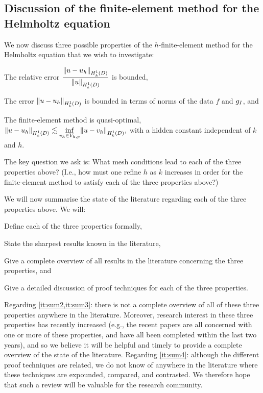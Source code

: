 \subsection{Discussion of the finite-element method for the Helmholtz equation}\label{sec:helmfedisc}

We now discuss three possible properties of the $h$-finite-element method for the Helmholtz equation that we wish to investigate:
\bit
\item The relative error $\displaystyle \frac{\NHokD{u-\uh}}{\NHokD{u}}$ is bounded,
\item The error $\NHokD{u-\uh}$ is bounded in terms of norms of the data $f$ and $g_{I}$, and
  \item The finite-element method is quasi-optimal, $\displaystyle \NHokD{u-\uh} \lesssim \inf_{\vh \in \Vhp} \NHokD{u-\vh},$
    \eit
    with a hidden constant independent of $k$ and $h.$

    The key question we ask is: What mesh conditions lead to each of the three properties above? (I.e., how must one refine $h$ as $k$ increases in order for the finite-element method to satisfy each of the three properties above?)

    We will now summarise the state of the literature regarding each of the three properties above. We will:
    \ben
  \item Define each of the three properties formally,
  \item\label{it:sum2} State the sharpest results known in the literature,
  \item\label{it:sum3} Give a complete overview of all results in the literature concerning the three properties, and
    \item\label{it:sum4} Give a detailed discussion of proof techniques for each of the three properties.
      \een

Regarding \cref{it:sum2,it:sum3}: there is not a complete overview of all of these three properties anywhere in the literature. Moreover, research interest in these three properties has recently increased (e.g., the recent papers \cite{ChNi:18,ChGaNiTo:18,ChNi:19,LiWu:19} are all concerned with one or more of these properties, and have all been completed within the last two years), and so we believe it will be helpful and timely to provide a complete overview of the state of the literature. Regarding \cref{it:sum4}: although the different proof techniques are related, we do not know of anywhere in the literature where these techniques are expounded, compared, and contrasted. We therefore hope that such a review will be valuable for the research community.


